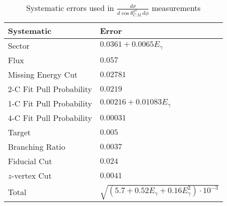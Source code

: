 \begin{table}[h!]
\begin{center}


\caption[Systematics]{\label{tab:systematics}Systematic errors used in $\frac{d\sigma}{d\cos\theta^{\pi^0}_{C.M.} d\phi}$ measurements \vspace{0.75mm}}

\begin{tabular}{p{5.25cm} | p{5.35cm}}
\hline
Systematic & Error \\
\hline
Sector  & $ 0.0361 + 0.0065E_{\gamma}$ \\
Flux  & $ 0.057$ \\
Missing Energy Cut  & $0.02781$ \\
2-C Fit Pull Probability & $0.0219$ \\
1-C Fit Pull Probability  & $ 0.00216 + 0.01083E_{\gamma}$ \\
4-C Fit Pull Probability  & $0.00031$ \\ 
Target  & $0.005$ \\
Branching Ratio  & $0.0037$ \\
Fiducial Cut & $0.024$ \\
$z$-vertex Cut & $0.0041$ \\
Total & $\sqrt{(5.7 +0.52E_{\gamma} +0.16E_{\gamma}^2)\cdot10^{-3}}$ \\
\hline \hline
\end{tabular}


\end{center}
\end{table}
\vspace{20pt}